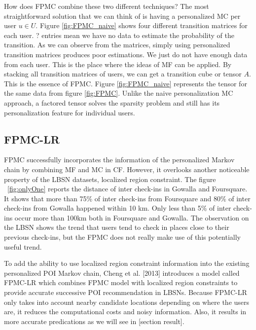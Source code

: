 \documentclass{sig-alternate}
\begin{document}
How does FPMC combine these two different techniques? The most straightforward solution that 
we can think of is having a personalized MC per user $u \in U$. Figure \ref{fig:FPMC_naive} shows 
four different transition matrices for each user. 
? entries mean we have no data 
to estimate the probability of the transition. As we can observe from the matrices, simply using 
personalized transition matrices produces poor estimations. We just do not have enough data from
each user. This is the place where the ideas of 
MF can be applied. By stacking all transition matrices of users, we can get a transition cube or tensor $A$. 
This is the essence of FPMC. Figure \ref{fig:FPMC_naive} represents the tensor for the same data from figure 
\ref{fig:FPMC}. Unlike the naive personalization MC approach, a factored tensor solves the sparsity problem and 
still has its personalization feature for individual users.

\subsection{FPMC-LR}
\label{sec:typeChangesSpecialChars}

FPMC successfully incorporates the information of the personalized Markov chain 
by combining MF and MC in CF. However, it overlooks another noticeable property 
of the LBSN datasets, localized region constraint. The figure ~\ref{fig:onlyOne}  
reports the distance of inter check-ins in Gowalla and Foursquare. It shows that 
more than 75\% of inter check-ins from Foursquare and 80\% of inter check-ins 
from Gowalla happened within 10 km. Only less than 5\% of inter check-ins occur 
more than 100km both in Foursquare and Gowalla. The observation on the LBSN 
shows the trend that users tend to check in places close to their previous check-ins, 
but the FPMC does not really make use of this potentially useful trend.

To add the ability to use localized region constraint 
information into the existing personalized POI Markov chain, Cheng et al. [2013] 
introduces a model called FPMC-LR which combines FPMC model with localized 
region constraints to provide accurate successive POI recommendation in LBSNs. 
Because FPMC-LR only takes into account nearby candidate locations depending 
on where the users are, it reduces the computational costs and noisy information. 
Also, it results in more accurate predications as we will see in [section result].
\end{document}
